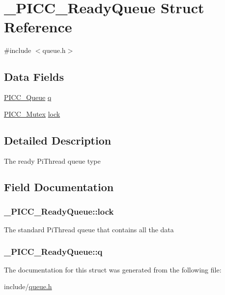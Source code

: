 \hypertarget{struct__PICC__ReadyQueue}{\section{\-\_\-\-P\-I\-C\-C\-\_\-\-Ready\-Queue Struct Reference}
\label{struct__PICC__ReadyQueue}
}


{\ttfamily \#include $<$queue.\-h$>$}

\subsection*{Data Fields}
{\bf }\par
\begin{DoxyCompactItemize}
\item 
\hyperlink{queue_8h_ae5dce037e07e8fe39960a37b09cd626d}{P\-I\-C\-C\-\_\-\-Queue} \hyperlink{struct__PICC__ReadyQueue_ac4e899f90d0faddf5b1d3c15cf1a721a}{q}
\item 
\hyperlink{sync_8h_a600a20a1dd394c06182a81d72e3357f4}{P\-I\-C\-C\-\_\-\-Mutex} \hyperlink{struct__PICC__ReadyQueue_a1bece21393ab646dff0dab6dfcc75862}{lock}
\end{DoxyCompactItemize}



\subsection{Detailed Description}
The ready Pi\-Thread queue type 

\subsection{Field Documentation}
\hypertarget{struct__PICC__ReadyQueue_a1bece21393ab646dff0dab6dfcc75862}{
\subsubsection[{lock}]{ \-\_\-\-P\-I\-C\-C\-\_\-\-Ready\-Queue\-::lock}}\label{struct__PICC__ReadyQueue_a1bece21393ab646dff0dab6dfcc75862}
The standard Pi\-Thread queue that contains all the data \hypertarget{struct__PICC__ReadyQueue_ac4e899f90d0faddf5b1d3c15cf1a721a}{
\subsubsection[{q}]{ \-\_\-\-P\-I\-C\-C\-\_\-\-Ready\-Queue\-::q}}\label{struct__PICC__ReadyQueue_ac4e899f90d0faddf5b1d3c15cf1a721a}


The documentation for this struct was generated from the following file\-:\begin{DoxyCompactItemize}
\item 
include/\hyperlink{queue_8h}{queue.\-h}\end{DoxyCompactItemize}
